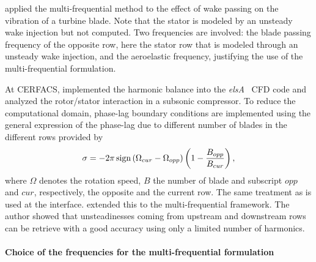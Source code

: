 \citet{Ekici2008a} applied the multi-frequential method
to the effect of wake passing on the vibration of
a turbine blade. Note that the stator is modeled
by an unsteady wake injection but not computed.
Two frequencies are involved: the blade passing
frequency of the opposite row, here the
stator row that is modeled through an unsteady wake injection,
and the aeroelastic frequency, justifying the use
of the multi-frequential formulation.


At CERFACS, \citet{JSicot2012} implemented the harmonic balance 
into the \textit{elsA}~\cite{Cambier2013} CFD code
and analyzed the rotor/stator interaction in a subsonic
compressor. To reduce the computational domain, 
phase-lag boundary conditions are implemented
using the general expression of the phase-lag due to
different number of blades in the different rows 
provided by \citet{Gerolymos1991}
\begin{equation}
 	\sigma = - 2 \pi \operatorname{sign} \left(\Omega_{cur} - \Omega_{opp} \right) 
 	\left(1 - \frac{B_{opp}}{B_{cur}}\right),
\end{equation} 
where $\Omega$ denotes the rotation speed, $B$ the number
of blade and subscript $opp$ and $cur$, respectively, the
opposite and the current row. The same treatment as \citet{Gopinath2007}
is used at the interface.
\citet{ThesisGuedeney} extended this to the multi-frequential framework.
The author showed that unsteadinesses coming from upstream and downstream
rows can be retrieve with a good accuracy using only a limited 
number of harmonics.

\paragraph{Choice of the frequencies for the multi-frequential formulation}
\label{par:choice_of_frequencies}

